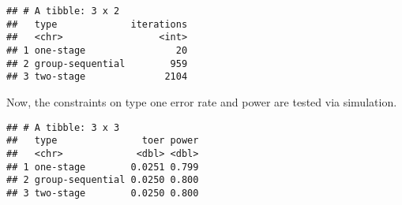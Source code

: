 \documentclass[]{book}
\newenvironment{Shaded}{\begin{snugshade}}{\end{snugshade}}
\newcommand{\DataTypeTok}[1]{\textcolor[rgb]{0.13,0.29,0.53}{#1}}
\newcommand{\DecValTok}[1]{\textcolor[rgb]{0.00,0.00,0.81}{#1}}
\newcommand{\FloatTok}[1]{\textcolor[rgb]{0.00,0.00,0.81}{#1}}
\newcommand{\KeywordTok}[1]{\textcolor[rgb]{0.13,0.29,0.53}{\textbf{#1}}}
\newcommand{\NormalTok}[1]{#1}
\newcommand{\OperatorTok}[1]{\textcolor[rgb]{0.81,0.36,0.00}{\textbf{#1}}}
\newcommand{\StringTok}[1]{\textcolor[rgb]{0.31,0.60,0.02}{#1}}
\begin{document}
\begin{verbatim}
## # A tibble: 3 x 2
##   type             iterations
##   <chr>                 <int>
## 1 one-stage                20
## 2 group-sequential        959
## 3 two-stage              2104
\end{verbatim}

Now, the constraints on type one error rate and power are tested via simulation.

\begin{Shaded}
\end{Shaded}

\begin{verbatim}
## # A tibble: 3 x 3
##   type               toer power
##   <chr>             <dbl> <dbl>
## 1 one-stage        0.0251 0.799
## 2 group-sequential 0.0250 0.800
## 3 two-stage        0.0250 0.800
\end{verbatim}
\end{document}
